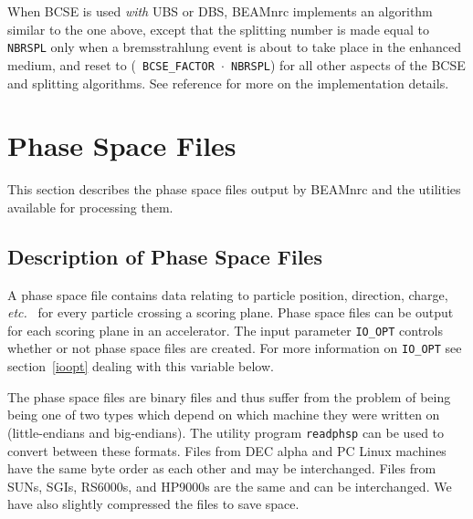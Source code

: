 \documentclass[12pt,twoside]{article}
\newcommand{\etc}{{\em etc.}}
\begin{document}
\noindent When BCSE is used {\em with} UBS or DBS, BEAMnrc implements
an algorithm similar to the one above, except that the splitting
number is made equal to {\tt NBRSPL} only when a bremsstrahlung event
is about to take place in the enhanced medium, and reset to ({\tt
BCSE\_FACTOR $\cdot$ NBRSPL}) for all other aspects of the BCSE and
splitting algorithms. See reference\cite{AR07} for more on the
implementation details.

\bigskip


\section{Phase Space Files}
\label{PSF}

This section describes the phase space files output by BEAMnrc and the
utilities available for processing them.

\subsection{Description of Phase Space Files}
\label{DPSF}
A phase space file contains data relating to particle position, direction,
charge, \etc~ for every particle crossing a scoring plane.  Phase space
files can be output for each scoring plane in an accelerator.  The input
parameter \verb+IO_OPT+ controls whether or not phase space files are
created.  For more information on \verb+IO_OPT+ see section~\ref{ioopt}
dealing with this variable below.  

The phase space files are binary files and thus suffer from the problem of
being being one of two types which depend on which machine they were
written on (little-endians and big-endians).  The utility program
\verb+readphsp+ can be used to convert between these formats. Files from
DEC alpha and PC Linux machines have the same byte order as each other and
may be interchanged.  Files from SUNs, SGIs, RS6000s, and HP9000s are the
same and can be interchanged.  We have also slightly compressed the files
to save space.
\end{document}
